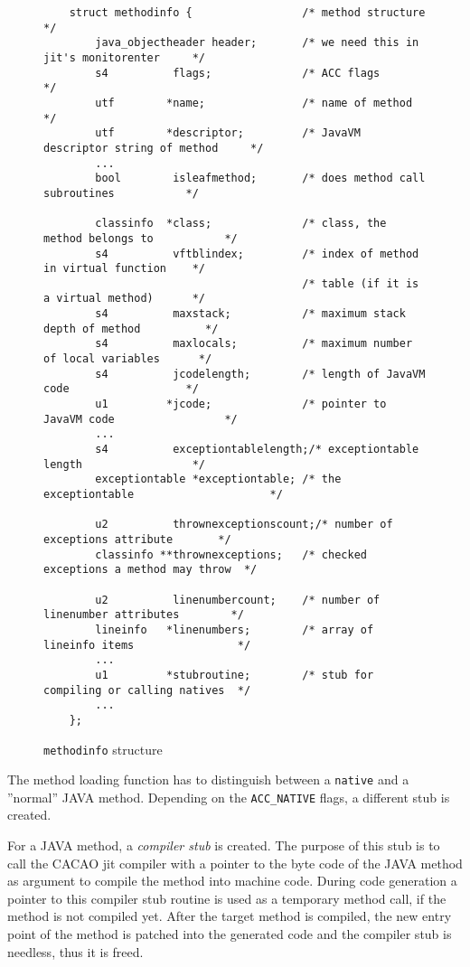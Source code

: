 \begin{figure}[h]
\begin{verbatim}
    struct methodinfo {                 /* method structure                       */
        java_objectheader header;       /* we need this in jit's monitorenter     */
        s4          flags;              /* ACC flags                              */
        utf        *name;               /* name of method                         */
        utf        *descriptor;         /* JavaVM descriptor string of method     */
        ...
        bool        isleafmethod;       /* does method call subroutines           */

        classinfo  *class;              /* class, the method belongs to           */
        s4          vftblindex;         /* index of method in virtual function    */
                                        /* table (if it is a virtual method)      */
        s4          maxstack;           /* maximum stack depth of method          */
        s4          maxlocals;          /* maximum number of local variables      */
        s4          jcodelength;        /* length of JavaVM code                  */
        u1         *jcode;              /* pointer to JavaVM code                 */
        ...
        s4          exceptiontablelength;/* exceptiontable length                 */
        exceptiontable *exceptiontable; /* the exceptiontable                     */

        u2          thrownexceptionscount;/* number of exceptions attribute       */
        classinfo **thrownexceptions;   /* checked exceptions a method may throw  */

        u2          linenumbercount;    /* number of linenumber attributes        */
        lineinfo   *linenumbers;        /* array of lineinfo items                */
        ...
        u1         *stubroutine;        /* stub for compiling or calling natives  */
        ...
    };
\end{verbatim}
\caption{\texttt{methodinfo} structure}
\label{methodinfostructure}
\end{figure}

The method loading function has to distinguish between a
\texttt{native} and a ''normal'' JAVA method. Depending on the
\texttt{ACC\_NATIVE} flags, a different stub is created.

For a JAVA method, a \textit{compiler stub} is created. The purpose of
this stub is to call the CACAO jit compiler with a pointer to the byte
code of the JAVA method as argument to compile the method into machine
code. During code generation a pointer to this compiler stub routine
is used as a temporary method call, if the method is not compiled
yet. After the target method is compiled, the new entry point of the
method is patched into the generated code and the compiler stub is
needless, thus it is freed.

